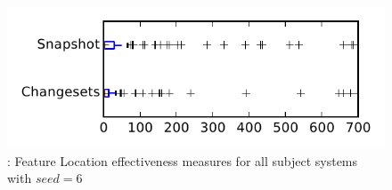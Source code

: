 
\begin{figure}
\centering
\includegraphics[height=0.4\textheight]{figures/flt_seed/rq1_tiny_6}
\caption{\rone: Feature Location effectiveness measures for all subject systems with $seed=6$}
\label{fig:flt_seed:rq1:tiny}
\end{figure}

